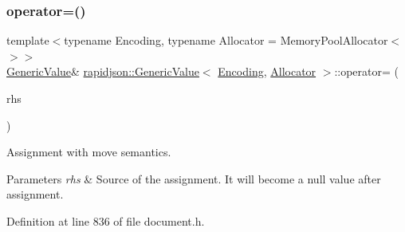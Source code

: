 \subsubsection{\texorpdfstring{operator=()}{operator=()}\hspace{0.1cm}{\footnotesize\ttfamily [1/2]}}
{\footnotesize\ttfamily template$<$typename Encoding, typename Allocator = Memory\+Pool\+Allocator$<$$>$$>$ \\
\mbox{\hyperlink{classrapidjson_1_1_generic_value}{Generic\+Value}}\& \mbox{\hyperlink{classrapidjson_1_1_generic_value}{rapidjson\+::\+Generic\+Value}}$<$ \mbox{\hyperlink{classrapidjson_1_1_encoding}{Encoding}}, \mbox{\hyperlink{classrapidjson_1_1_allocator}{Allocator}} $>$\+::operator= (\begin{DoxyParamCaption}\item[{\mbox{\hyperlink{classrapidjson_1_1_generic_value}{Generic\+Value}}$<$ \mbox{\hyperlink{classrapidjson_1_1_encoding}{Encoding}}, \mbox{\hyperlink{classrapidjson_1_1_allocator}{Allocator}} $>$ \&}]{rhs }\end{DoxyParamCaption})}



Assignment with move semantics. 


\begin{DoxyParams}{Parameters}
{\em rhs} & Source of the assignment. It will become a null value after assignment. \\
\hline
\end{DoxyParams}


Definition at line 836 of file document.\+h.


\begin{DoxyCode}{0}

\end{DoxyCode}
\mbox{\label{classrapidjson_1_1_generic_value_aecc9d0a6aafe31f4fdf9f6e75e5f089c}} 
